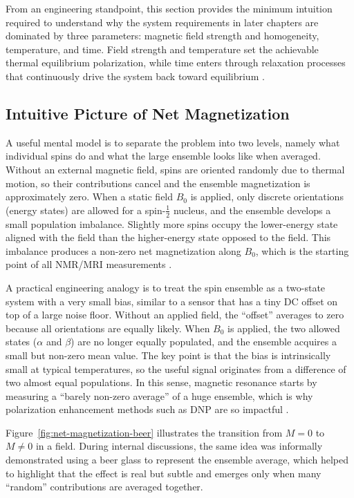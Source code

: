 \documentclass[FM,DP,EN,twoside]{tulthesis}
\begin{document}
From an engineering standpoint, this section provides the minimum intuition required to understand why the system requirements in later chapters are dominated by three parameters: magnetic field strength and homogeneity, temperature, and time. Field strength and temperature set the achievable thermal equilibrium polarization, while time enters through relaxation processes that continuously drive the system back toward equilibrium \cite{Kruger2001vh}.

\subsection{Intuitive Picture of Net Magnetization}
\label{subsec:intuitive-net-magnetization-beer-analogy}
A useful mental model is to separate the problem into two levels, namely what individual spins do and what the large ensemble looks like when averaged. Without an external magnetic field, spins are oriented randomly due to thermal motion, so their contributions cancel and the ensemble magnetization is approximately zero. When a static field $B_0$ is applied, only discrete orientations (energy states) are allowed for a spin-$\frac{1}{2}$ nucleus, and the ensemble develops a small population imbalance. Slightly more spins occupy the lower-energy state aligned with the field than the higher-energy state opposed to the field. This imbalance produces a non-zero net magnetization along $B_0$, which is the starting point of all NMR/MRI measurements \cite{spin_physics_intro_ref}.

A practical engineering analogy is to treat the spin ensemble as a two-state system with a very small bias, similar to a sensor that has a tiny DC offset on top of a large noise floor. Without an applied field, the ``offset'' averages to zero because all orientations are equally likely. When $B_0$ is applied, the two allowed states (\(\alpha\) and \(\beta\)) are no longer equally populated, and the ensemble acquires a small but non-zero mean value. The key point is that the bias is intrinsically small at typical temperatures, so the useful signal originates from a difference of two almost equal populations. In this sense, magnetic resonance starts by measuring a ``barely non-zero average'' of a huge ensemble, which is why polarization enhancement methods such as DNP are so impactful \cite{DNP_intro_ref}\cite{widrow_ryu_schleicher_subramanian_tsagas_treumann_2011}.

Figure~\ref{fig:net-magnetization-beer} illustrates the transition from $M=0$ to $M\neq 0$ in a field. During internal discussions, the same idea was informally demonstrated using a beer glass to represent the ensemble average, which helped to highlight that the effect is real but subtle and emerges only when many ``random'' contributions are averaged together.
\end{document}
